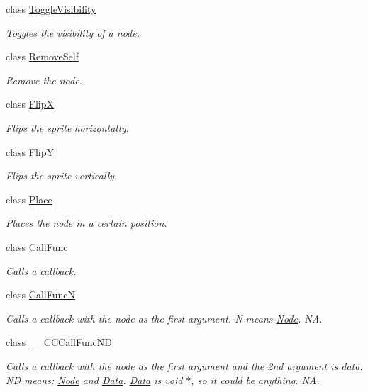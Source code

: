 \begin{DoxyCompactItemize}
class \hyperlink{classToggleVisibility}{Toggle\+Visibility}
\begin{DoxyCompactList}\small\item\em Toggles the visibility of a node. \end{DoxyCompactList}\item 
class \hyperlink{classRemoveSelf}{Remove\+Self}
\begin{DoxyCompactList}\small\item\em Remove the node. \end{DoxyCompactList}\item 
class \hyperlink{classFlipX}{FlipX}
\begin{DoxyCompactList}\small\item\em Flips the sprite horizontally. \end{DoxyCompactList}\item 
class \hyperlink{classFlipY}{FlipY}
\begin{DoxyCompactList}\small\item\em Flips the sprite vertically. \end{DoxyCompactList}\item 
class \hyperlink{classPlace}{Place}
\begin{DoxyCompactList}\small\item\em Places the node in a certain position. \end{DoxyCompactList}\item 
class \hyperlink{classCallFunc}{Call\+Func}
\begin{DoxyCompactList}\small\item\em Calls a \textquotesingle{}callback\textquotesingle{}. \end{DoxyCompactList}\item 
class \hyperlink{classCallFuncN}{Call\+FuncN}
\begin{DoxyCompactList}\small\item\em Calls a \textquotesingle{}callback\textquotesingle{} with the node as the first argument. N means \hyperlink{classNode}{Node}.  NA. \end{DoxyCompactList}\item 
class \hyperlink{class____CCCallFuncND}{\+\_\+\+\_\+\+C\+C\+Call\+Func\+ND}
\begin{DoxyCompactList}\small\item\em Calls a \textquotesingle{}callback\textquotesingle{} with the node as the first argument and the 2nd argument is data. ND means\+: \hyperlink{classNode}{Node} and \hyperlink{classData}{Data}. \hyperlink{classData}{Data} is void $\ast$, so it could be anything.  NA. \end{DoxyCompactList}\item 

\end{DoxyCompactItemize}
